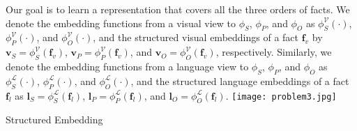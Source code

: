 \documentclass[runningheads]{llncs}
\begin{document}
Our goal is to learn a representation that covers all the three orders of facts.
We denote the embedding functions  from a visual view  to  $\phi_S$, $\phi_P$, and $\phi_O$ as  $\phi^{\mathcal{V}}_S(\cdot)$, $\phi^{\mathcal{V}}_P(\cdot)$, and $\phi^{\mathcal{V}}_O(\cdot)$, and the structured visual embeddings of a fact  $\mathbf{f}_v$ by  $\mathbf{v}_S=\phi^{\mathcal{V}}_S(\mathbf{f}_v)$, $\mathbf{v}_P=\phi^{\mathcal{V}}_P(\mathbf{f}_v)$, and $\mathbf{v}_O=\phi^{\mathcal{V}}_O(\mathbf{f}_v)$, respectively. Similarly, we  denote the embedding functions from a language view to  $\phi_S$, $\phi_P$, and $\phi_O$ as  $\phi^{\mathcal{L}}_S(\cdot)$, $\phi^{\mathcal{L}}_P(\cdot)$, and $\phi^{\mathcal{L}}_O(\cdot)$, and the structured language embeddings of a fact  $\mathbf{f}_l$ as $\mathbf{l}_S=\phi^{\mathcal{L}}_S(\mathbf{f}_l)$, $\mathbf{l}_P=\phi^{\mathcal{L}}_P(\mathbf{f}_l)$, and $\mathbf{l}_O=\phi^{\mathcal{L}}_O(\mathbf{f}_l)$.
\centering\vspace{-7mm}
   \hspace{-4mm} \texttt{[image: problem3.jpg]}
      \vspace{-4mm}
    \caption{Structured Embedding }
\end{document}
